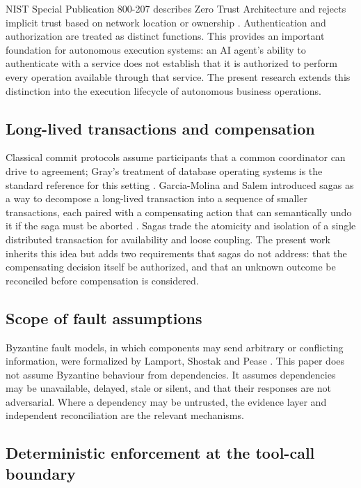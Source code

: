 \documentclass[11pt,a4paper]{article}
\begin{document}
NIST Special Publication 800-207 describes Zero Trust Architecture and rejects implicit trust based on network location or ownership \cite{nist}. Authentication and authorization are treated as distinct functions. This provides an important foundation for autonomous execution systems: an AI agent's ability to authenticate with a service does not establish that it is authorized to perform every operation available through that service. The present research extends this distinction into the execution lifecycle of autonomous business operations.

\subsection{Long-lived transactions and compensation}

Classical commit protocols assume participants that a common coordinator can drive to agreement; Gray's treatment of database operating systems is the standard reference for this setting \cite{gray}. Garcia-Molina and Salem introduced sagas as a way to decompose a long-lived transaction into a sequence of smaller transactions, each paired with a compensating action that can semantically undo it if the saga must be aborted \cite{sagas}. Sagas trade the atomicity and isolation of a single distributed transaction for availability and loose coupling. The present work inherits this idea but adds two requirements that sagas do not address: that the compensating decision itself be authorized, and that an unknown outcome be reconciled before compensation is considered.

\subsection{Scope of fault assumptions}

Byzantine fault models, in which components may send arbitrary or conflicting information, were formalized by Lamport, Shostak and Pease \cite{byzantine}. This paper does not assume Byzantine behaviour from dependencies. It assumes dependencies may be unavailable, delayed, stale or silent, and that their responses are not adversarial. Where a dependency may be untrusted, the evidence layer and independent reconciliation are the relevant mechanisms.

\subsection{Deterministic enforcement at the tool-call boundary}
\end{document}
